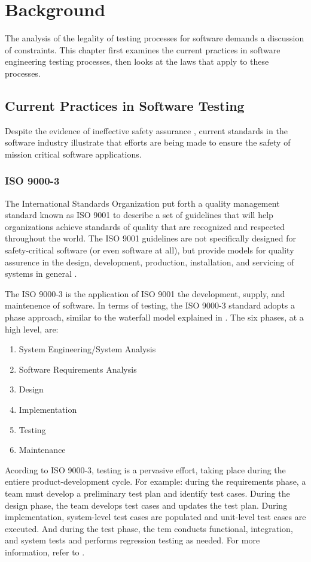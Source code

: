 \chapter{Background}\label{C:Background}
The analysis of the legality of testing processes for software demands a
discussion of constraints. This chapter first examines the current practices in
software engineering testing processes, then looks at the laws that apply to
these processes.

\section{Current Practices in Software Testing}
Despite the evidence of ineffective safety assurance \cite{Leveson93,Maisel05},
current standards in the software industry illustrate that efforts are being
made to ensure the safety of mission critical software applications.


\subsection{ISO 9000-3}
The International Standards Organization put forth a quality management standard
known as ISO 9001 to describe a set of guidelines that will help organizations
achieve standards of quality that are recognized and respected throughout the
world. The ISO 9001 guidelines are not specifically designed for safety-critical
software (or even software at all), but provide models for quality assurence
in the design, development, production, installation, and servicing of systems
in general \cite{Kehoe96}.

The ISO 9000-3 is the application of ISO 9001 the development, supply, and
maintenence of software. In terms of testing, the ISO 9000-3 standard adopts a
phase approach, similar to the waterfall model explained in \cite{Royce70}. The
six phases, at a high level, are:
\singlespace
\begin{enumerate}
  \item System Engineering/System Analysis
  \item Software Requirements Analysis
  \item Design
  \item Implementation
  \item Testing
  \item Maintenance
\end{enumerate}
\doublespace
Acording to ISO 9000-3, testing is a pervasive effort, taking place during the
entiere product-development cycle. For example: during the requirements phase, a
team must develop a preliminary test plan and identify test cases. During the
design phase, the team develops test cases and updates the test plan. During
implementation, system-level test cases are populated and unit-level test cases
are executed. And during the test phase, the tem conducts functional,
integration, and system tests and performs regression testing as needed. For
more information, refer to \cite{Kehoe96}.

